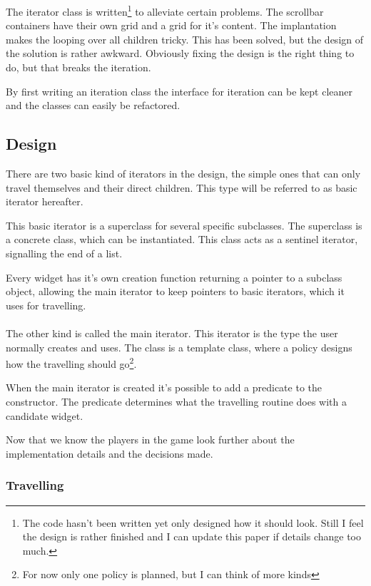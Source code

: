 The iterator class is written\footnote{The code hasn't been written yet only
designed how it should look. Still I feel the design is rather finished and I
can update this paper if details change too much.} to alleviate certain
problems. The scrollbar containers have their own grid and a grid for it's
content. The implantation makes the looping over all children tricky. This has
been solved, but the design of the solution is rather awkward. Obviously fixing
the design is the right thing to do, but that breaks the iteration.

By first writing an iteration class the interface for iteration can be kept
cleaner and the classes can easily be refactored.

\subsection{Design}

There are two basic kind of iterators in the design, the simple ones that can
only travel themselves and their direct children. This type will be referred to
as basic iterator hereafter. 

This basic iterator is a superclass for several specific subclasses. The
superclass is a concrete class, which can be instantiated. This class acts as a
sentinel iterator, signalling the end of a list.

Every widget has it's own creation function returning a pointer to a subclass
object, allowing the main iterator to keep pointers to basic iterators, which it
uses for travelling.

\paragraph{}

The other kind is called the main iterator. This iterator is the type the user
normally creates and uses. The class is a template class, where a policy designs
how the travelling should go\footnote{For now only one policy is planned, but I
can think of more kinds}.

When the main iterator is created it's possible to add a predicate to the
constructor. The predicate determines what the travelling routine does with a
candidate widget.

Now that we know the players in the game look further about the implementation
details and the decisions made.

\subsubsection{Travelling}

